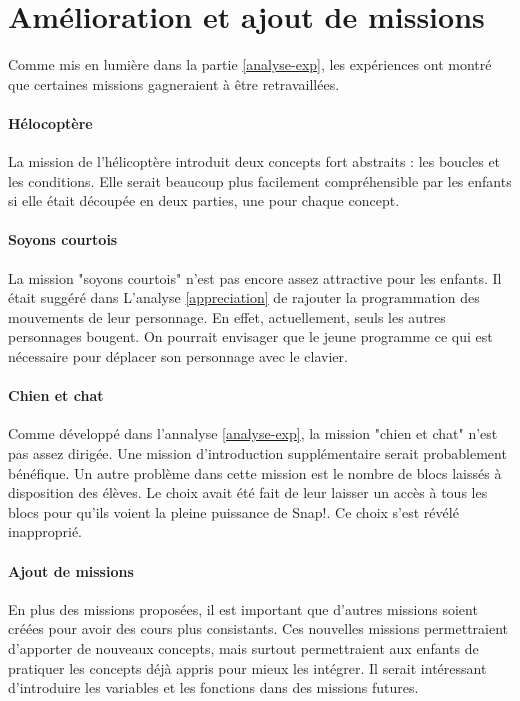 \section{Amélioration et ajout de missions}
Comme mis en lumière dans la partie \ref{analyse-exp}, les expériences ont montré que certaines missions gagneraient à être retravaillées.

\paragraph{Hélocoptère}
La mission de l'hélicoptère introduit deux concepts fort abstraits : les boucles et les conditions. Elle serait beaucoup plus facilement compréhensible par les enfants si elle était découpée en deux parties, une pour chaque concept.

\paragraph{Soyons courtois}
La mission "soyons courtois" n'est pas encore assez attractive pour les enfants. Il était suggéré dans L'analyse \ref{appreciation} de rajouter la programmation des mouvements de leur personnage. En effet, actuellement, seuls les autres personnages bougent. On pourrait envisager que le jeune programme ce qui est nécessaire pour déplacer son personnage avec le clavier.

\paragraph{Chien et chat}
Comme développé dans l'annalyse \ref{analyse-exp}, la mission "chien et chat" n'est pas assez dirigée. Une mission d'introduction supplémentaire serait probablement bénéfique. Un autre problème dans cette mission est le nombre de blocs laissés à disposition des élèves. Le choix avait été fait de leur laisser un accès à tous les blocs pour qu'ils voient la pleine puissance de Snap!. Ce choix s'est révélé inapproprié. 

\paragraph{Ajout de missions}
En plus des missions proposées, il est important que d'autres missions soient créées pour avoir des cours plus consistants. Ces nouvelles missions permettraient d'apporter de nouveaux concepts, mais surtout permettraient aux enfants de pratiquer les concepts déjà appris pour mieux les intégrer. Il serait intéressant d'introduire les variables et les fonctions dans des missions futures.


